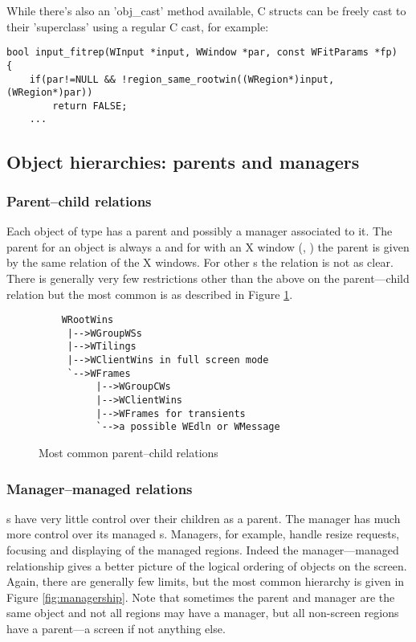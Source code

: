 While there's also an 'obj\_cast' method available, C structs can be freely 
cast to their 'superclass' using a regular C cast, for example:

\begin{verbatim}
bool input_fitrep(WInput *input, WWindow *par, const WFitParams *fp)
{
    if(par!=NULL && !region_same_rootwin((WRegion*)input, (WRegion*)par))
        return FALSE;
    ...
\end{verbatim}

\subsection{Object hierarchies:  parents and managers}

\subsubsection{Parent--child relations}
Each object of type  has a parent and possibly a manager
associated to it. The parent for an object is always a 
 and for  with an X window (,
) the parent  is given by the same relation of
the X windows. For other s the relation is not as clear.
There is generally very few restrictions other than the above on the
parent---child relation but the most common is as described in
Figure \ref{fig:parentship}.

\begin{figure}
\begin{htmlonly}
\docode %
\end{htmlonly}
\begin{verbatim}
    WRootWins
     |-->WGroupWSs
     |-->WTilings
     |-->WClientWins in full screen mode
     `-->WFrames
          |-->WGroupCWs
          |-->WClientWins
          |-->WFrames for transients
          `-->a possible WEdln or WMessage
\end{verbatim}
\caption{Most common parent--child relations}
\label{fig:parentship}
\end{figure}

\subsubsection{Manager--managed relations}

s have very little control over their children as a parent.
The manager  has much more control over its
managed s. Managers, for example, handle resize requests,
focusing and displaying of the managed regions. Indeed the manager---managed
relationship gives a better picture of the logical ordering of objects on
the screen. Again, there are generally few limits, but the most common
hierarchy is given in Figure \ref{fig:managership}. Note that sometimes
the parent and manager are the same object and not all regions may have
a manager, but all non-screen regions have a parent---a screen if not 
anything else.

